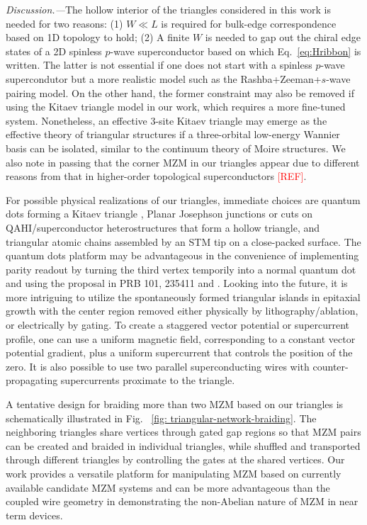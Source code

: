 \documentclass[aps,prb,showpacs,amsmath,twocolumn,amssymb,superscriptaddress]{revtex4-2}
\newcommand{\Red}[1]{\textcolor{red}{#1}}
\begin{document}
\emph{Discussion.---}The hollow interior of the triangles considered in this work is needed for two reasons: (1) $W\ll L$ is required for bulk-edge correspondence based on 1D topology to hold; (2) A finite $W$ is needed to gap out the chiral edge states of a 2D spinless $p$-wave superconductor based on which Eq.~\eqref{eq:Hribbon} is written. The latter is not essential if one does not start with a spinless $p$-wave supercondutor but a more realistic model such as the Rashba+Zeeman+$s$-wave pairing model. On the other hand, the former constraint may also be removed if using the Kitaev triangle model in our work, which requires a more fine-tuned system. Nonetheless, an effective 3-site Kitaev triangle may emerge as the effective theory of triangular structures if a three-orbital low-energy Wannier basis can be isolated, similar to the continuum theory of Moire structures. We also note in passing that the corner MZM in our triangles appear due to different reasons from that in higher-order topological superconductors \Red{[REF]}. 

For possible physical realizations of our triangles, immediate choices are quantum dots forming a Kitaev triangle \cite{dvirRealizationMinimalKitaev2023}, Planar Josephson junctions or cuts on QAHI/superconductor heterostructures \cite{xieCreatingLocalizedMajorana2021} that form a hollow triangle, and triangular atomic chains assembled by an STM tip \cite{schneiderPrecursorsMajoranaModes2022} on a close-packed surface. The quantum dots platform may be advantageous in the convenience of implementing parity readout by turning the third vertex temporily into a normal quantum dot and using the proposal in PRB 101, 235411 and \cite{fengProbingRobustMajorana2022}. Looking into the future, it is more intriguing to utilize the spontaneously formed triangular islands in epitaxial growth \cite{pietzschSpinResolvedElectronicStructure2006} with the center region removed either physically by lithography/ablation, or electrically by gating. To create a staggered vector potential or supercurrent profile, one can use a uniform magnetic field, corresponding to a constant vector potential gradient, plus a uniform supercurrent that controls the position of the zero. It is also possible to use two parallel superconducting wires with counter-propagating supercurrents proximate to the triangle.

A tentative design for braiding more than two MZM based on our triangles is schematically illustrated in Fig. ~\ref{fig: triangular-network-braiding}. The neighboring triangles share vertices through gated gap regions so that MZM pairs can be created and braided in individual triangles, while shuffled and transported through different triangles by controlling the gates at the shared vertices. Our work provides a versatile platform for manipulating MZM based on currently available candidate MZM systems and can be more advantageous than the coupled wire geometry in demonstrating the non-Abelian nature of MZM in near term devices.
\end{document}
